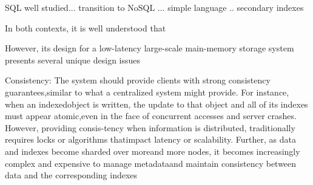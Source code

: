 




SQL well studied...
transition to NoSQL ... simple language .. secondary indexes

In both contexts, it is well understood that

However, its design for a low-latency large-scale main-memory storage system presents several unique design issues



Consistency: The system should provide clients with strong consistency guarantees,similar to what a centralized system might provide.  For instance, when an indexedobject is written, the update to that object and all of its indexes must appear atomic,even in the face of concurrent accesses and server crashes.  However, providing consis-tency when information is distributed, traditionally requires locks or algorithms thatimpact latency or scalability.  Further, as data and indexes become sharded over moreand more nodes, it becomes increasingly complex and expensive to manage metadataand maintain consistency between data and the corresponding indexes


